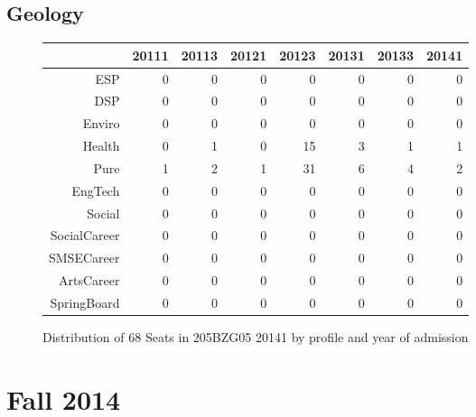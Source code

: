 \documentclass{article}\usepackage[]{graphicx}\usepackage[]{color}
\begin{document}
\subsection{Geology}
\begin{figure}[H]
\centering
\begin{tabular}{rrrrrrrr}
  \hline
 & 20111 & 20113 & 20121 & 20123 & 20131 & 20133 & 20141 \\ 
  \hline
ESP &   0 &   0 &   0 &   0 &   0 &   0 &   0 \\ 
  DSP &   0 &   0 &   0 &   0 &   0 &   0 &   0 \\ 
  Enviro &   0 &   0 &   0 &   0 &   0 &   0 &   0 \\ 
  Health &   0 &   1 &   0 &  15 &   3 &   1 &   1 \\ 
  Pure &   1 &   2 &   1 &  31 &   6 &   4 &   2 \\ 
  EngTech &   0 &   0 &   0 &   0 &   0 &   0 &   0 \\ 
  Social &   0 &   0 &   0 &   0 &   0 &   0 &   0 \\ 
  SocialCareer &   0 &   0 &   0 &   0 &   0 &   0 &   0 \\ 
  SMSECareer &   0 &   0 &   0 &   0 &   0 &   0 &   0 \\ 
  ArtsCareer &   0 &   0 &   0 &   0 &   0 &   0 &   0 \\ 
  SpringBoard &   0 &   0 &   0 &   0 &   0 &   0 &   0 \\ 
   \hline
\end{tabular}
\caption{Distribution of 68 Seats in 205BZG05 20141 by profile and year of admission} 
\end{figure}



\section{Fall 2014}
\end{document}
